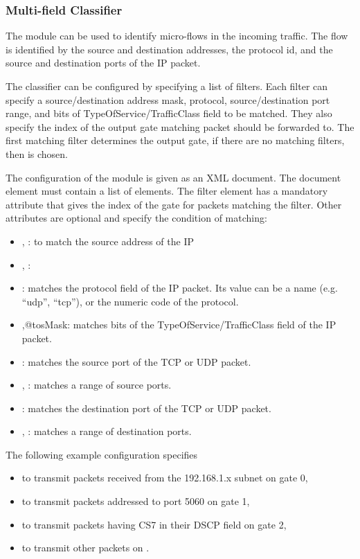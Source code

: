 \subsubsection*{Multi-field Classifier}

The  module can be used to identify
micro-flows in the incoming traffic. The flow is identified
by the source and destination addresses, the protocol id,
and the source and destination ports of the IP packet.

The classifier can be configured by specifying a list of filters.
Each filter can specify a source/destination address mask, protocol,
source/destination port range, and bits of TypeOfService/TrafficClass
field to be matched. They also specify the index of the output gate
matching packet should be forwarded to. The first matching filter
determines the output gate, if there are no matching filters,
then  is chosen.

The configuration of the module is given as an XML document.
The document element must contain a list of  elements.
The filter element has a mandatory  attribute that gives
the index of the gate for packets matching the filter. Other attributes
are optional and specify the condition of matching:
\begin{itemize}
  \item {}, : to match the source
    address of the IP
  \item {}, :
  \item {}: matches the protocol field of the IP packet.
    Its value can be a name (e.g. ``udp'', ``tcp''),
    or the numeric code of the protocol.
  \item {},{@tosMask}: matches bits of the TypeOfService/TrafficClass
    field of the IP packet.
  \item {}: matches the source port of the TCP or UDP packet.
  \item {}, : matches a range of source ports.
  \item {}: matches the destination port of the TCP or UDP packet.
  \item {}, : matches a range of
     destination ports.
\end{itemize}

The following example configuration specifies
\begin{itemize}
  \item to transmit packets received from the 192.168.1.x subnet on gate 0,
  \item to transmit packets addressed to port 5060 on gate 1,
  \item to transmit packets having CS7 in their DSCP field on gate 2,
  \item to transmit other packets on .
\end{itemize}

